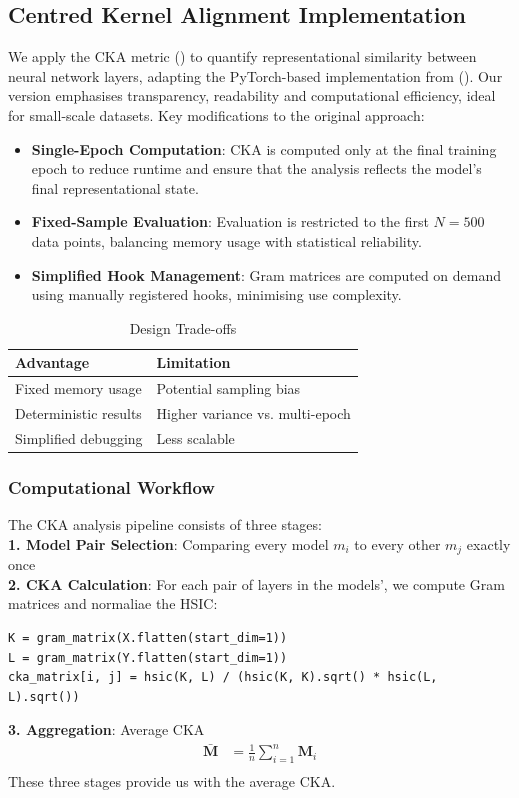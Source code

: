 \subsection{Centred Kernel Alignment Implementation}
We apply the CKA metric (\cite{Hinton}) to quantify representational similarity between neural network layers, adapting the PyTorch-based implementation from (\cite{numpeecka}). Our version emphasises transparency, readability and computational efficiency, ideal for small-scale datasets. Key modifications to the original approach:

\begin{itemize}
    \item \textbf{Single-Epoch Computation}: CKA is computed only at the final training epoch to reduce runtime and ensure that the analysis reflects the model's final representational state.
    \item \textbf{Fixed-Sample Evaluation}: Evaluation is restricted to the first $N=500$ data points, balancing memory usage with statistical reliability.
    \item \textbf{Simplified Hook Management}: Gram matrices are computed on demand using manually registered hooks, minimising use complexity.
\end{itemize}

\begin{table}[h]
    \centering
    \begin{tabular}{ll}
        \hline
        \textbf{Advantage} & \textbf{Limitation} \\
        \hline
        Fixed memory usage & Potential sampling bias \\
        Deterministic results & Higher variance vs. multi-epoch \\
        Simplified debugging & Less scalable \\
        \hline
    \end{tabular}
    \caption{Design Trade-offs}
\end{table}

\subsubsection{Computational Workflow}

The CKA analysis pipeline consists of three stages:\\
\textbf{1. Model Pair Selection}: Comparing every model $m_i$ to every other $m_j$ exactly once 
\vspace{0.5em}\\
\textbf{2. CKA Calculation}: For each pair of layers in the models', we compute Gram matrices and normaliae the HSIC:
\begin{verbatim}
K = gram_matrix(X.flatten(start_dim=1))
L = gram_matrix(Y.flatten(start_dim=1))
cka_matrix[i, j] = hsic(K, L) / (hsic(K, K).sqrt() * hsic(L, L).sqrt())
\end{verbatim}
\vspace{0.5em}
\textbf{3. Aggregation}: Average CKA
\begin{align}
\bar{\mathbf{M}} &= \frac{1}{n}\sum_{i=1}^n \mathbf{M}_i \\
\end{align}
These three stages provide us with the average CKA.
